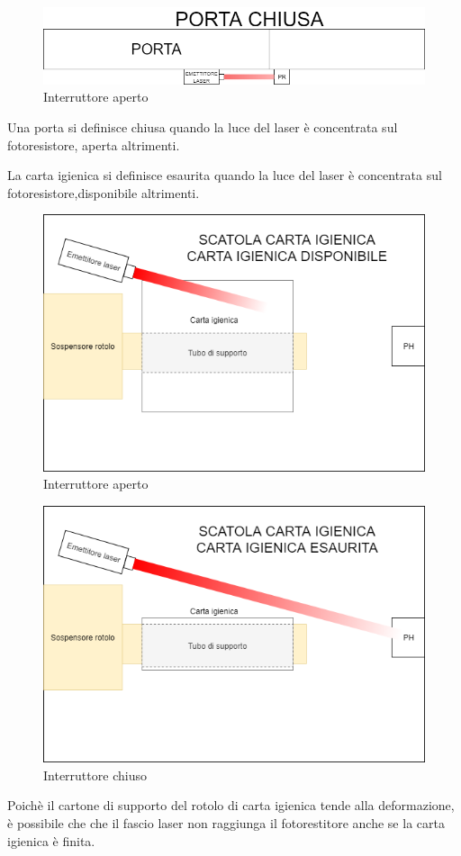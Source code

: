 \documentclass[12pt]{article}
\begin{document}
\begin{figure}[h!]
\centering
	\includegraphics[scale=0.45]{img/parteLocale/PortaChiusa.png} 
    \caption{Interruttore aperto}
\end{figure}
Una porta si definisce chiusa quando la luce del laser è concentrata sul fotoresistore, aperta altrimenti.


\newpage
La carta igienica si definisce esaurita quando la luce del laser è concentrata sul fotoresistore,disponibile altrimenti.
\begin{figure}[h!]
\centering
	\includegraphics[scale=0.55]{img/parteLocale/CartaIgienicaDisponibile.png}  
    \caption{Interruttore aperto}
\end{figure}

 
 \begin{figure}[h!]
\centering
	\includegraphics[scale=0.55]{img/parteLocale/CartaIgienicaEsaurita.png}  
    \caption{Interruttore chiuso}
\end{figure}
Poichè il cartone di supporto del rotolo di carta igienica tende alla deformazione, è possibile che che il fascio laser non raggiunga il fotorestitore anche se la carta igienica è finita.
\end{document}
